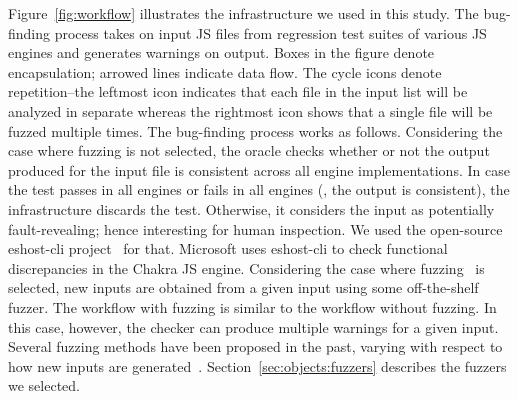 \documentclass[10pt,conference,anonymous]{IEEEtran}
\begin{document}
Figure~\ref{fig:workflow} illustrates the infrastructure we used in
this study.  The bug-finding process takes on input JS files from
regression test suites of various JS engines and generates warnings on
output. Boxes in the figure denote encapsulation; arrowed lines
indicate data flow. The cycle icons denote repetition--the leftmost
icon indicates that each file in the input list will be analyzed in
separate whereas the rightmost icon shows that a single file will be
fuzzed multiple times. The bug-finding process works as follows.
Considering the case where fuzzing is not selected, the oracle checks
whether or not the output produced for the input file is consistent
across all engine implementations. In case the test passes in all
engines or fails in all engines (\ie{}, the output is consistent), the
infrastructure discards the test. Otherwise, it considers the input as
potentially fault-revealing; hence interesting for human
inspection. We used the open-source eshost-cli
project~\cite{eshost-cli} for that. Microsoft uses eshost-cli to check
functional discrepancies in the Chakra JS engine. Considering the case
where fuzzing~\cite{fuzz-testing-history} is selected, new inputs are
obtained from a given input using some off-the-shelf fuzzer. The
workflow with fuzzing is similar to the workflow without fuzzing. In
this case, however, the checker can produce multiple warnings for a
given input. Several fuzzing methods have been proposed in the past,
varying with respect to how new inputs are
generated~\cite{afl,honggfuzz,grammarinator,jsfunfuzz,radamsa}.
Section~\ref{sec:objects:fuzzers} describes the fuzzers we selected.
\end{document}

